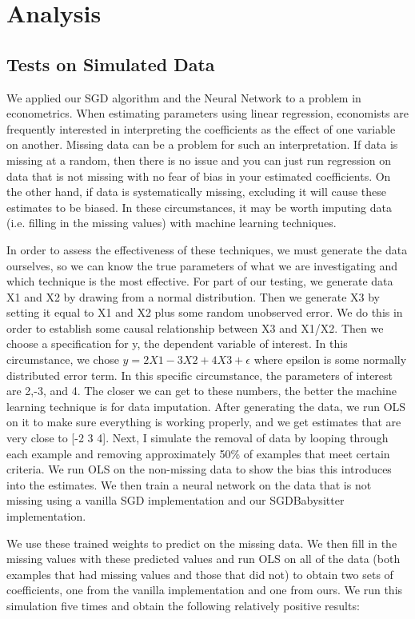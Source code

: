 \documentclass{article}
\begin{document}
\section{Analysis}
\subsection{Tests on Simulated Data}
We applied our SGD algorithm and the Neural Network to a problem in econometrics. When estimating parameters using linear regression, economists are frequently interested in interpreting the coefficients as the effect of one variable on another. Missing data can be a problem for such an interpretation. If data is missing at a random, then there is no issue and you can just run regression on data that is not missing with no fear of bias in your estimated coefficients. On the other hand, if data is systematically missing, excluding it will cause these estimates to be biased.  In these circumstances, it may be worth imputing data (i.e. filling in the missing values) with machine learning techniques. 
\par In order to assess the effectiveness of these techniques, we must generate the data ourselves, so we can know the true parameters of what we are investigating and which technique is the most effective. 
For part of our testing, we generate data X1 and X2 by drawing from a normal distribution. Then we generate X3 by setting it equal to X1 and X2 plus some random unobserved error. We do this in order to establish some causal relationship between X3 and X1/X2.  Then we choose a specification for y, the dependent variable of interest. In this circumstance, we chose $y=2X1-3X2+4X3 +\epsilon$ where epsilon is some normally distributed error term.  In this specific circumstance, the parameters of interest are 2,-3, and 4. The closer we can get to these numbers, the better the machine learning technique is for data imputation. 
After generating the data, we run OLS on it to make sure everything is working properly, and we get estimates that are very close to [-2 3 4]. Next, I simulate the removal of data by looping through each example and removing approximately 50\% of examples that meet certain criteria.   We run OLS on the non-missing data to show the bias this introduces into the estimates. We then train a neural network on the data that is not missing using a vanilla SGD implementation and our SGDBabysitter implementation.  
\par We use these trained weights to predict on the missing data. We then fill in the missing values with these predicted values and run OLS on all of the data (both examples that had missing values and those that did not) to obtain two sets of coefficients, one from the vanilla implementation and one from ours.  We run this simulation five times and obtain the following relatively positive results:
\end{document}
